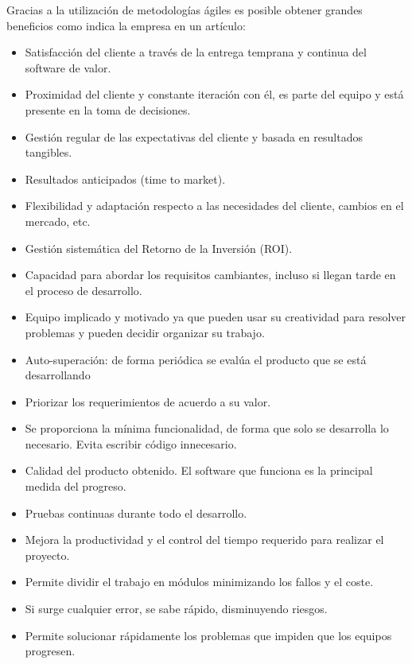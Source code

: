 Gracias a la utilización de metodologías ágiles es posible obtener grandes beneficios como indica la empresa \citep{braventAgile} en un artículo:
\begin{itemize}
    \item Satisfacción del cliente a través de la entrega temprana y continua del software de valor.
    \item Proximidad del cliente y constante iteración con él, es parte del equipo y está presente en la toma de decisiones.
    \item Gestión regular de las expectativas del cliente y basada en resultados tangibles.
    \item Resultados anticipados (time to market).
    \item Flexibilidad y adaptación respecto a las necesidades del cliente, cambios en el mercado, etc.
    \item Gestión sistemática del Retorno de la Inversión (ROI).
    \item Capacidad para abordar los requisitos cambiantes, incluso si llegan tarde en el proceso de desarrollo.
    \item Equipo implicado y motivado ya que pueden usar su creatividad para resolver problemas y pueden decidir organizar su trabajo.
    \item Auto-superación: de forma periódica se evalúa el producto que se está desarrollando
    \item Priorizar los requerimientos de acuerdo a su valor.
    \item Se proporciona la mínima funcionalidad, de forma que solo se desarrolla lo necesario. Evita
escribir código innecesario.
    \item Calidad del producto obtenido. El software que funciona es la principal medida del
progreso.
    \item Pruebas continuas durante todo el desarrollo.
    \item Mejora la productividad y el control del tiempo requerido para realizar el proyecto.
    \item Permite dividir el trabajo en módulos minimizando los fallos y el coste.
    \item Si surge cualquier error, se sabe rápido, disminuyendo riesgos.
    \item Permite solucionar rápidamente los problemas que impiden que los equipos progresen.
\end{itemize}
